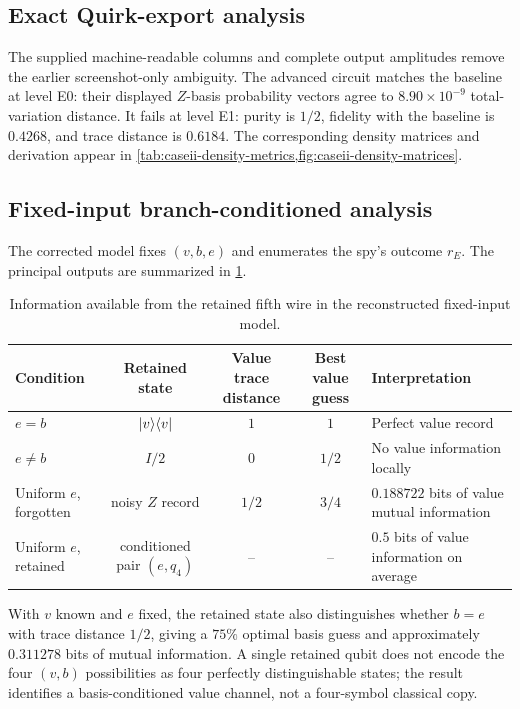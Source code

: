 \subsection{Exact Quirk-export analysis}

The supplied machine-readable columns and complete output amplitudes remove the
earlier screenshot-only ambiguity. The advanced circuit matches the baseline
at level E0: their displayed $Z$-basis probability vectors agree to
$8.90\times10^{-9}$ total-variation distance. It fails at level E1: purity is
$1/2$, fidelity with the baseline is $0.4268$, and trace distance is $0.6184$.
The corresponding density matrices and derivation appear in
\cref{tab:caseii-density-metrics,fig:caseii-density-matrices}.

\subsection{Fixed-input branch-conditioned analysis}

The corrected model fixes $(v,b,e)$ and enumerates the spy's outcome $r_E$. The
principal outputs are summarized in \cref{tab:fixed-input-summary}.

\begin{table}[ht]
\centering
\caption{Information available from the retained fifth wire in the reconstructed
fixed-input model.}
\label{tab:fixed-input-summary}
\begin{tabularx}{\textwidth}{@{}lcccX@{}}
\toprule
Condition & Retained state & Value trace distance & Best value guess & Interpretation\\
\midrule
$e=b$ & $\ket{v}\!\bra{v}$ & $1$ & $1$ & Perfect value record\\
$e\neq b$ & $I/2$ & $0$ & $1/2$ & No value information locally\\
Uniform $e$, forgotten & noisy $Z$ record & $1/2$ & $3/4$ &
$0.188722$ bits of value mutual information\\
Uniform $e$, retained & conditioned pair $(e,q_4)$ & -- & -- &
$0.5$ bits of value information on average\\
\bottomrule
\end{tabularx}
\end{table}

With $v$ known and $e$ fixed, the retained state also distinguishes whether
$b=e$ with trace distance $1/2$, giving a $75\%$ optimal basis guess and
approximately $0.311278$ bits of mutual information. A single retained qubit
does not encode the four $(v,b)$ possibilities as four perfectly distinguishable
states; the result identifies a basis-conditioned value channel, not a
four-symbol classical copy.

